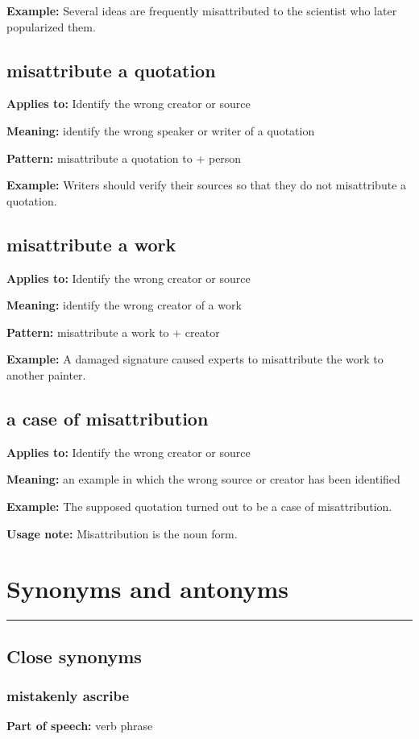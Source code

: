 \documentclass[11pt]{article}
\newcommand{\sectionrule}{\par\vspace{-0.5em}\noindent\textcolor{Accent}{\rule{\linewidth}{0.6pt}}\par}
\begin{document}
\textbf{Example:} Several ideas are frequently misattributed to the scientist who later popularized them.

\subsection{misattribute a quotation}
\textbf{Applies to:} Identify the wrong creator or source

\textbf{Meaning:} identify the wrong speaker or writer of a quotation

\textbf{Pattern:} misattribute a quotation to + person

\textbf{Example:} Writers should verify their sources so that they do not misattribute a quotation.

\subsection{misattribute a work}
\textbf{Applies to:} Identify the wrong creator or source

\textbf{Meaning:} identify the wrong creator of a work

\textbf{Pattern:} misattribute a work to + creator

\textbf{Example:} A damaged signature caused experts to misattribute the work to another painter.

\subsection{a case of misattribution}
\textbf{Applies to:} Identify the wrong creator or source

\textbf{Meaning:} an example in which the wrong source or creator has been identified

\textbf{Example:} The supposed quotation turned out to be a case of misattribution.

\textbf{Usage note:} Misattribution is the noun form.

\section{Synonyms and antonyms}
\sectionrule
\subsection{Close synonyms}
\subsubsection{mistakenly ascribe}
\textbf{Part of speech:} verb phrase
\end{document}
